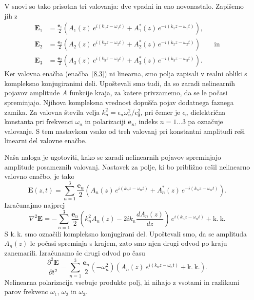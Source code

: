 V snovi so tako prisotna tri valovanja:
dve vpadni in eno novonastalo. Zapišemo jih z 
\begin{align}
\mathbf{E}_{1} & =  \frac{\mathbf{e}_{1}}{2}\left(A_{1}(z)\, 
e^{i(k_{1}z-\omega_{1}t)}+A_{1}^{*}(z)\, e^{-i(k_{1}z-\omega_{1}t)}\right)\!,\nonumber \\
\mathbf{E}_{2} & =  \frac{\mathbf{e}_{2}}{2}\left(A_{2}(z)\, 
e^{i(k_{2}z-\omega_{2}t)}+A_{2}^{*}(z)\, e^{-i(k_{2}z-\omega_{2}t)}\right) \qquad \mathrm{in} \nonumber \\
\mathbf{E}_{3} & =  \frac{\mathbf{e}_{3}}{2}\left(A_{3}(z)\, 
e^{i(k_{3}z-\omega_{3}t)}+A_{3}^{*}(z)\, e^{-i(k_{3}z-\omega_{3}t)}\right)\!.
\end{align}
Ker valovna enačba (enačba~\ref{8.3}) ni linearna, smo polja 
zapisali v realni obliki s kompleksno konjugiranimi
deli. Upoštevali smo tudi,
da so zaradi nelinearnih pojavov amplitude $A$ funkcije kraja, za
katere privzamemo, da se le počasi spreminjajo. Njihova kompleksna vrednost
dopušča pojav dodatnega faznega zamika. Za valovna
števila velja $k_{n}^{2}=\epsilon_{n}\omega_n^{2}/c_0^{2}$,
pri čemer je $\epsilon_{n}$ dielektrična konstanta pri frekvenci
$\omega_{n}$ in polarizaciji $\mathbf{e}_{n}$, indeks $n = 1...3$ pa označuje
valovanje. S tem nastavkom vsako od treh valovanj
pri konstantni amplitudi reši linearni del valovne enačbe. 

Naša naloga
je ugotoviti, kako se zaradi nelinearnih pojavov spreminjajo amplitude posameznih valovanj.
Nastavek za polje, ki bo približno rešil nelinearno valovno enačbo, je tako
\begin{equation}
\mathbf{E}(z,t) = \sum_{n=1}^3 \frac{\mathbf{e}_{n}}{2}\left(A_{n}(z)\, 
e^{i(k_{n}z-\omega_{n}t)}+A_{n}^{*}(z)\, e^{-i(k_{n}z-\omega_{n}t)}\right)\!.
\label{eq:nlnastavek}
\end{equation}
Izračunajmo najprej 
\begin{equation}
\nabla^{2}\mathbf{E}=-\sum_{n=1}^3 \frac{\mathbf{e}_{n}}{2}\left(k_{n}^{2}A_{n}(z)-2ik_{n}
\frac{dA_{n}(z)}{dz}\right)\, e^{i(k_{n}z-\omega_{n}t)}+\mathrm{k.~k.}
\label{8.5}
\end{equation}
S k.\,k. smo označili kompleksno konjugirani del. Upoštevali smo,
da se amplituda $A_{n}(z)$ le počasi spreminja s krajem, zato smo njen
drugi odvod po kraju zanemarili.
Izračunamo še drugi odvod po času 
\begin{equation}
\frac{\partial^2\mathbf{E}}{\partial t^2}=\sum_{n=1}^3 \frac{\mathbf{e}_{n}}{2}
\left(-\omega_n^2\right) \left(A_{n}(z)\, e^{i(k_{n}z-\omega_{n}t)}+\mathrm{k.~k.}\right)\!.
\label{8.5a}
\end{equation}
Nelinearna polarizacija vsebuje produkte polj, ki nihajo z
vsotami in razlikami parov frekvenc $\omega_{1}$, $\omega_{2}$ in
$\omega_{3}$.

